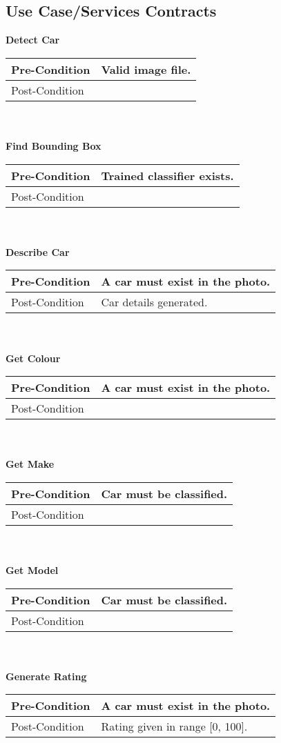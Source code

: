 \subsection{Use Case/Services Contracts}
\textbf{Detect Car} \\
\begin{tabular}{| l | l |}
	\hline
	Pre-Condition & Valid image file. \\
	\hline
	Post-Condition & \\
	\hline
\end{tabular}
\\
\\
\textbf{Find Bounding Box} \\
\begin{tabular}{| l | l |}
	\hline
	Pre-Condition & Trained classifier exists.\\
	\hline
	Post-Condition & \\
	\hline
\end{tabular}
\\
\\
\textbf{Describe Car} \\
\begin{tabular}{| l | l |}
	\hline
	Pre-Condition & A car must exist in the photo.\\
	\hline
	Post-Condition & Car details generated.\\
	\hline
\end{tabular}
\\
\\
\textbf{Get Colour} \\
\begin{tabular}{| l | l |}
	\hline
	Pre-Condition & A car must exist in the photo.\\
	\hline
	Post-Condition & \\
	\hline
\end{tabular}
\\
\\
\textbf{Get Make} \\
\begin{tabular}{| l | l |}
	\hline
	Pre-Condition & Car must be classified.\\
	\hline
	Post-Condition & \\
	\hline
\end{tabular}
\\
\\
\textbf{Get Model} \\
\begin{tabular}{| l | l |}
	\hline
	Pre-Condition & Car must be classified.\\
	\hline
	Post-Condition & \\
	\hline
\end{tabular}
\\
\\
\textbf{Generate Rating}  \\
\begin{tabular}{| l | l |}
	\hline
	Pre-Condition & A car must exist in the photo.\\
	\hline
	Post-Condition & Rating given in range [0, 100].\\
	\hline
\end{tabular}
\\
\\
\pagebreak
